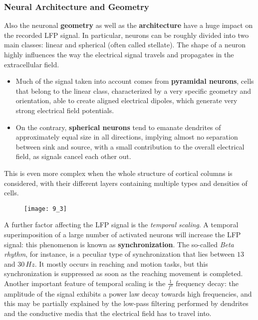 \subsubsection{Neural Architecture and Geometry}
Also the neuronal \textbf{geometry} as well as the \textbf{architecture} have a huge
impact on the recorded LFP signal. In particular, neurons can be roughly divided into
two main classes: linear and spherical (often called stellate). The shape of a neuron
highly influences the way the electrical signal travels and propagates in the
extracellular field.
\begin{itemize}
    \item Much of the signal taken into account comes from \textbf{pyramidal neurons},
          cells that belong to the linear class, characterized by a very specific
          geometry and orientation, able to create aligned electrical dipoles, which
          generate very strong electrical field potentials.
    \item On the contrary, \textbf{spherical neurons} tend to emanate dendrites of
          approximately equal size in all directions, implying almost no separation
          between sink and source, with a small contribution to the overall electrical
          field, as signals cancel each other out.
\end{itemize}
This is even more complex when the whole structure of cortical columns is considered,
with their different layers containing multiple types and densities of cells.
\begin{figure}[H]
    \texttt{[image: 9\_3]}
    \centering
\end{figure}
A further factor affecting the LFP signal is the \textit{temporal scaling}. A temporal
superimposition of a large number of activated neurons will increase the LFP signal:
this phenomenon is known as \textbf{synchronization}. The so-called \textit{Beta rhythm},
for instance, is a peculiar type of synchronization that lies between \(13\) and
\(30\,Hz\). It mostly occurs in reaching and motion tasks, but this synchronization
is suppressed as soon as the reaching movement is completed. Another important feature
of temporal scaling is the \(\frac{1}{f^{\alpha}}\) frequency decay: the amplitude of
the signal exhibits a power law decay towards high frequencies, and this may be
partially explained by the low-pass filtering performed by dendrites and the
conductive media that the electrical field has to travel into.

